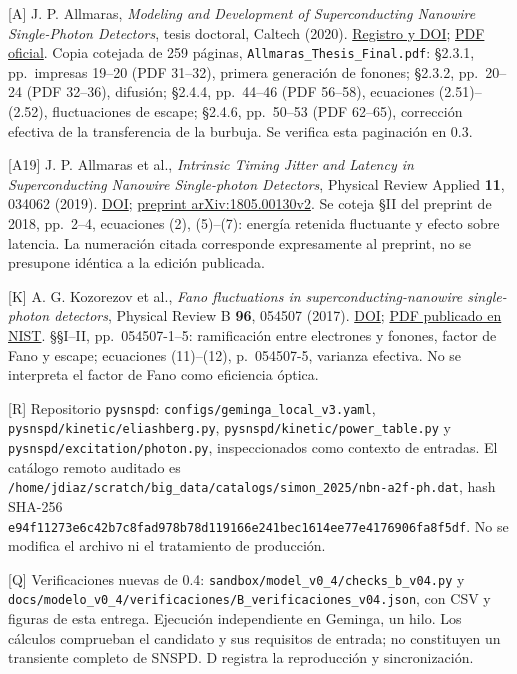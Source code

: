 \documentclass[
  spanish,
  10pt,
  a4paper,
]{article}
\newcounter{none} %
\begin{document}
{[}A{]} J. P. Allmaras, \emph{Modeling and Development of
Superconducting Nanowire Single-Photon Detectors}, tesis doctoral,
Caltech (2020). \href{https://thesis.caltech.edu/13748/}{Registro y
DOI};
\href{https://thesis.caltech.edu/13748/08/Allmaras_Thesis_Final.pdf}{PDF
oficial}. Copia cotejada de 259 páginas,
\nolinkurl{Allmaras_Thesis_Final.pdf}: §2.3.1, pp.~impresas 19--20 (PDF
31--32), primera generación de fonones; §2.3.2, pp.~20--24 (PDF 32--36),
difusión; §2.4.4, pp.~44--46 (PDF 56--58), ecuaciones (2.51)--(2.52),
fluctuaciones de escape; §2.4.6, pp.~50--53 (PDF 62--65), corrección
efectiva de la transferencia de la burbuja. Se verifica esta paginación
en 0.3.

{[}A19{]} J. P. Allmaras et al., \emph{Intrinsic Timing Jitter and
Latency in Superconducting Nanowire Single-photon Detectors}, Physical
Review Applied \textbf{11}, 034062 (2019).
\href{https://doi.org/10.1103/PhysRevApplied.11.034062}{DOI};
\href{https://arxiv.org/pdf/1805.00130v2}{preprint arXiv:1805.00130v2}.
Se coteja §II del preprint de 2018, pp.~2--4, ecuaciones (2), (5)--(7):
energía retenida fluctuante y efecto sobre latencia. La numeración
citada corresponde expresamente al preprint, no se presupone idéntica a
la edición publicada.

{[}K{]} A. G. Kozorezov et al., \emph{Fano fluctuations in
superconducting-nanowire single-photon detectors}, Physical Review B
\textbf{96}, 054507 (2017).
\href{https://doi.org/10.1103/PhysRevB.96.054507}{DOI};
\href{https://tsapps.nist.gov/publication/get_pdf.cfm?pub_id=920691}{PDF
publicado en NIST}. §§I--II, pp.~054507-1--5: ramificación entre
electrones y fonones, factor de Fano y escape; ecuaciones (11)--(12),
p.~054507-5, varianza efectiva. No se interpreta el factor de Fano como
eficiencia óptica.

{[}R{]} Repositorio \nolinkurl{pysnspd}:
\nolinkurl{configs/geminga_local_v3.yaml},
\nolinkurl{pysnspd/kinetic/eliashberg.py},
\nolinkurl{pysnspd/kinetic/power_table.py} y
\nolinkurl{pysnspd/excitation/photon.py}, inspeccionados como contexto de
entradas. El catálogo remoto auditado es
\nolinkurl{/home/jdiaz/scratch/big_data/catalogs/simon_2025/nbn-a2f-ph.dat},
hash SHA-256
\nolinkurl{e94f11273e6c42b7c8fad978b78d119166e241bec1614ee77e4176906fa8f5df}.
No se modifica el archivo ni el tratamiento de producción.

{[}Q{]} Verificaciones nuevas de 0.4:
\nolinkurl{sandbox/model_v0_4/checks_b_v04.py} y
\nolinkurl{docs/modelo_v0_4/verificaciones/B_verificaciones_v04.json},
con CSV y figuras de esta entrega. Ejecución independiente en Geminga,
un hilo. Los cálculos comprueban el candidato y sus requisitos de
entrada; no constituyen un transiente completo de SNSPD. D registra la
reproducción y sincronización.
\end{document}
